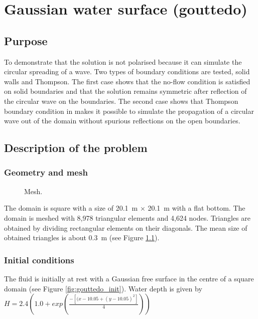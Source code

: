 \chapter{Gaussian water surface (gouttedo)}

\section{Purpose}

To demonstrate that the  solution is not polarised because it can
simulate the circular spreading of a wave.
Two types of boundary conditions are tested, solid walls and Thompson.
The first case shows that the no-flow
condition is satisfied on solid boundaries and that the solution remains
symmetric after reflection of the circular wave on the boundaries.
The second case shows that Thompson boundary condition in 
makes it possible to simulate the propagation of a circular wave out of the
domain without spurious reflections on the open boundaries.

\section{Description of the problem}

\subsection{Geometry and mesh}

\begin{figure}[h]
\begin{center}
\end{center}
\caption{Mesh.}
\label{fig:gouttedo_mesh}
\end{figure}

The domain is square with a size of 20.1~m $\times$ 20.1~m with a flat bottom.
The domain is meshed with 8,978 triangular elements and 4,624 nodes.
Triangles are obtained by dividing rectangular elements on their diagonals.
The mean size of obtained triangles is about 0.3~m (see Figure
\ref{fig:gouttedo_mesh}).

\subsection{Initial conditions}
The fluid is initially at rest with a Gaussian free surface in the centre of a
square domain (see Figure \ref{fig:gouttedo_init}). Water depth is given by
$ H= 2.4 \left(1.0+exp \left( \frac{-\left[ (x-10.05+( y-10.05)^2\right]}{ 4}\right)\right) $

